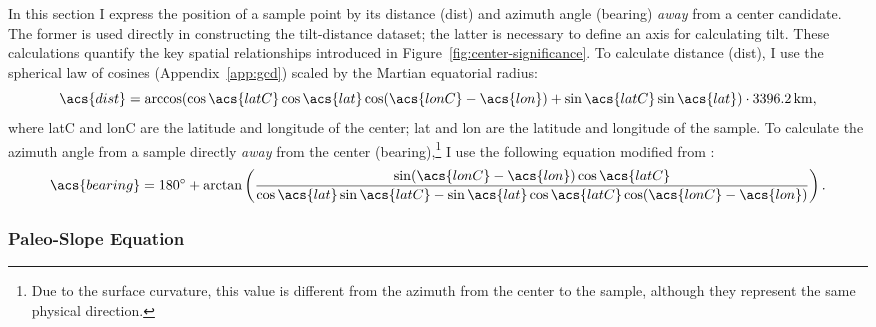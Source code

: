 In this section I express the position of a sample point by its distance (\acs{dist}) and azimuth angle (\acs{bearing}) \emph{away} from a center candidate. The former is used directly in constructing the tilt-distance dataset; the latter is necessary to define an axis for calculating tilt. These calculations quantify the key spatial relationships introduced in Figure~\ref{fig:center-significance}. To calculate distance (\acs{dist}), I use the spherical law of cosines (Appendix~\ref{app:gcd}) scaled by the Martian equatorial radius:
\begin{equation}
    \acs{dist}=\arccos(\cos\acs{latC}\cos\acs{lat}\cos(\acs{lonC}-\acs{lon}) + \sin\acs{latC}\sin\acs{lat})\cdot\qty{3396.2}{\km},\label{eq:dist}
\end{equation}
where \acs{latC} and \acs{lonC} are the latitude and longitude of the center; \acs{lat} and \acs{lon} are the latitude and longitude of the sample. To calculate the azimuth angle from a sample directly \emph{away} from the center (\acs{bearing}),\footnote{Due to the surface curvature, this value is different from the azimuth from the center to the sample, although they represent the same physical direction.} I use the following equation modified from \textcite{williams_aviation, veness_calculate}:
\begin{equation}
    \acs{bearing} = \ang{180} + \arctan\left(\frac{\sin(\acs{lonC}-\acs{lon})\cos\acs{latC}} {\cos\acs{lat} \sin\acs{latC}-\sin\acs{lat}\cos\acs{latC}\cos(\acs{lonC}-\acs{lon})}\right).\label{eq:bearing}
\end{equation} 

\subsubsection{Paleo-Slope Equation}\label{sec:paleo-slope}

